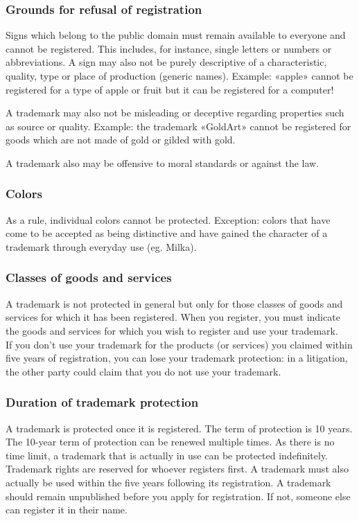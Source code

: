 \subsubsection{Grounds for refusal of registration}
\begin{compactitem}
	\item Signs which belong to the public domain must remain available to everyone and cannot be registered.
	This includes, for instance, single letters or numbers or abbreviations. A sign may also not be purely descriptive of a characteristic, quality, type or place of production (generic names). Example: «apple» cannot be registered for a type of apple or fruit but it can be registered for a computer!
	\item A trademark may also not be misleading or deceptive regarding	properties such as source or quality. Example: the trademark «GoldArt» cannot be registered for goods which are not made of gold or gilded with gold.
	\item A trademark also may be offensive to moral standards or against the law.
\end{compactitem}

\subsubsection{Colors}
As a rule, individual colors cannot be protected. Exception: colors that have come to be accepted as being distinctive and
have gained the character of a trademark through everyday use (eg. Milka).

\subsubsection{Classes of goods and services}
A trademark is not protected in general but only for those classes of goods and services for which it has been registered. When you register, you must indicate the goods and services for which you wish to register and use your trademark. \\
If you don’t use your trademark for the products (or services) you claimed within five years of registration, you can lose your trademark protection: in a litigation, the other party could claim that you do not use your trademark.

\subsubsection{Duration of trademark protection}
A trademark is protected once it is registered. The term of protection is 10 years. The 10-year term of protection can be renewed multiple times. As there is no time limit, a trademark that is actually in use can be protected indefinitely. Trademark rights are reserved for whoever registers first. A trademark must also actually be used within the five years following its registration. A trademark should remain unpublished before you apply for registration. If not, someone else can register it in their name.

